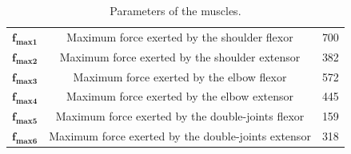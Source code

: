 \documentclass[pdftex,a4paper,11pt]{article}
\begin{document}
\begin{table}[hbt]
\caption{Parameters of the muscles.}
\begin{center}
\begin{tabular}{|c|c|c|}
\hline  
$\textbf{f}_{\textbf{max1}}$ & Maximum force exerted by the shoulder flexor & 700\\
$\textbf{f}_{\textbf{max2}}$ & Maximum force exerted by the shoulder extensor & 382\\
$\textbf{f}_{\textbf{max3}}$ & Maximum force exerted by the elbow flexor & 572\\
$\textbf{f}_{\textbf{max4}}$ & Maximum force exerted by the elbow extensor & 445\\
$\textbf{f}_{\textbf{max5}}$ & Maximum force exerted by the double-joints flexor & 159\\
$\textbf{f}_{\textbf{max6}}$ & Maximum force exerted by the double-joints extensor & 318\\
\hline
\end{tabular}
\end{center}
\label{MuscleParamTable}
\end{table}



\end{document}

